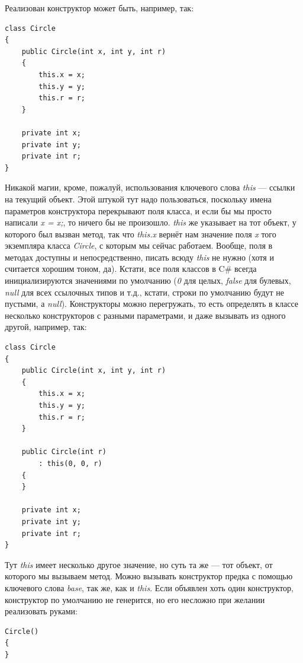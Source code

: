 \documentclass[a5paper]{article}
\begin{document}
Реализован конструктор может быть, например, так:

\begin{verbatim}
class Circle
{
    public Circle(int x, int y, int r)
    {
        this.x = x;
        this.y = y;
        this.r = r;
    }

    private int x;
    private int y;
    private int r;
}
\end{verbatim}

Никакой магии, кроме, пожалуй, использования ключевого слова \textit{this} --- ссылки на текущий объект. Этой штукой тут надо пользоваться, поскольку имена параметров конструктора перекрывают поля класса, и если бы мы просто написали \textit{x = x;}, то ничего бы не произошло. \textit{this} же указывает на тот объект, у которого был вызван метод, так что \textit{this.x} вернёт нам значение поля \textit{x} того экземпляра класса \textit{Circle}, с которым мы сейчас работаем. Вообще, поля в методах доступны и непосредственно, писать всюду \textit{this} не нужно (хотя и считается хорошим тоном, да). Кстати, все поля классов в C\# всегда инициализируются значениями по умолчанию (\textit{0} для целых, \textit{false} для булевых, \textit{null} для всех ссылочных типов и т.д., кстати, строки по умолчанию будут не пустыми, а \textit{null}). Конструкторы можно перегружать, то есть определять в классе несколько конструкторов с разными параметрами, и даже вызывать из одного другой, например, так:

\begin{verbatim}
class Circle
{
    public Circle(int x, int y, int r)
    {
        this.x = x;
        this.y = y;
        this.r = r;
    }

    public Circle(int r)
        : this(0, 0, r)
    {
    }

    private int x;
    private int y;
    private int r;
}
\end{verbatim}

Тут \textit{this} имеет несколько другое значение, но суть та же --- тот объект, от которого мы вызываем метод. Можно вызывать конструктор предка с помощью ключевого слова \textit{base}, так же, как и \textit{this}. Если объявлен хоть один конструктор, конструктор по умолчанию не генерится, но его несложно при желании реализовать руками: 

\begin{verbatim}
Circle()
{
}
\end{verbatim}
\end{document}
